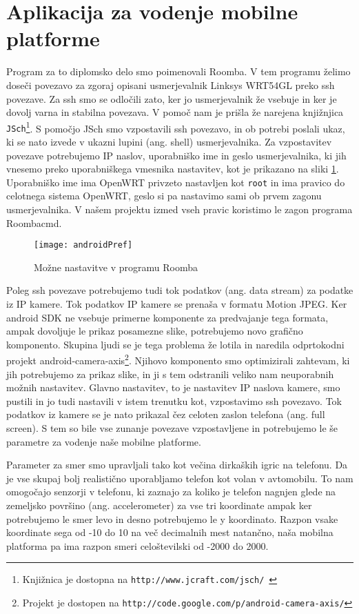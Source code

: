 \documentclass[a4paper, 12pt]{book}
\begin{document}
\section{Aplikacija za vodenje mobilne platforme}
Program za to diplomsko delo smo poimenovali Roomba. V tem programu želimo doseči povezavo za zgoraj opisani usmerjevalnik Linksys WRT54GL preko ssh povezave. Za ssh smo se odločili zato, ker jo usmerjevalnik že vsebuje in ker je dovolj varna in stabilna povezava. V pomoč nam je prišla že narejena knjižnjica {\tt JSch}\footnote{Knjižnica je dostopna na {\tt http://www.jcraft.com/jsch/}~\cite{bibJcraft}}. S pomočjo JSch smo vzpostavili ssh povezavo, in ob potrebi poslali ukaz, ki se nato izvede v ukazni lupini (ang. shell) usmerjevalnika. Za vzpostavitev povezave potrebujemo IP naslov, uporabniško ime in geslo usmerjevalnika, ki jih vnesemo preko uporabniškega vmesnika nastavitev, kot je prikazano na sliki \ref{picAndroidPref}. Uporabniško ime ima OpenWRT privzeto nastavljen kot {\tt root} in ima pravico do celotnega sistema OpenWRT, geslo si pa nastavimo sami ob prvem zagonu usmerjevalnika. V našem projektu izmed vseh pravic koristimo le zagon programa Roombacmd. 

\begin{figure}[h]
	\centering
	\texttt{[image: androidPref]}
	\caption{Možne nastavitve v programu Roomba}
	\label{picAndroidPref}
\end{figure}

Poleg ssh povezave potrebujemo tudi tok podatkov (ang. data stream) za podatke iz IP kamere. Tok podatkov IP kamere se prenaša v formatu Motion JPEG. Ker android SDK ne vsebuje primerne komponente za predvajanje tega formata, ampak dovoljuje le prikaz posamezne slike, potrebujemo novo grafično komponento. Skupina ljudi se je tega problema že lotila in naredila odprtokodni projekt android-camera-axis\footnote{Projekt je dostopen na {\tt http://code.google.com/p/android-camera-axis/}}. Njihovo komponento smo optimizirali zahtevam, ki jih potrebujemo za prikaz slike, in ji s tem odstranili veliko nam neuporabnih možnih nastavitev. Glavno nastavitev, to je nastavitev IP naslova kamere, smo pustili in jo tudi nastavili v istem trenutku kot, vzpostavimo ssh povezavo. Tok podatkov iz kamere se je nato prikazal čez celoten zaslon telefona (ang. full screen). S tem so bile vse zunanje povezave vzpostavljene in potrebujemo le še parametre za vodenje naše mobilne platforme. 

Parameter za smer smo upravljali tako kot večina dirkaških igric na telefonu. Da je vse skupaj bolj realistično uporabljamo telefon kot volan v avtomobilu. To nam omogočajo senzorji v telefonu, ki zaznajo za koliko je telefon nagnjen glede na zemeljsko površino (ang. accelerometer) za vse tri koordinate ampak ker potrebujemo le smer levo in desno potrebujemo le y koordinato. Razpon vsake koordinate sega od -10 do 10 na več decimalnih mest natančno, naša mobilna platforma pa ima razpon smeri celoštevilski od -2000 do 2000. 
\end{document}

